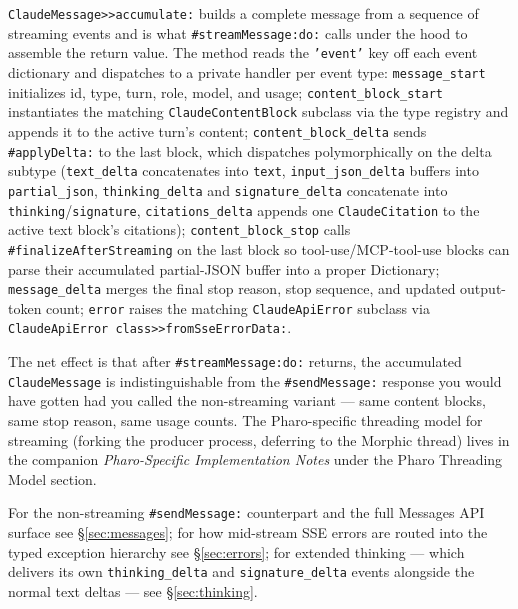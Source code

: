 \documentclass[a4paper,10pt,fleqn]{article}
\newcommand{\cls}[1]{\texttt{#1}}
\newcommand{\sel}[1]{\texttt{\##1}}
\begin{document}
\cls{ClaudeMessage>>accumulate:} builds a complete message
from a sequence of streaming events and is what
\sel{streamMessage:do:} calls under the hood to assemble the
return value.  The method reads the \texttt{'event'} key off
each event dictionary and dispatches to a private handler per
event type: \texttt{message\_start} initializes id, type, turn,
role, model, and usage; \texttt{content\_block\_start}
instantiates the matching \cls{ClaudeContentBlock} subclass
via the type registry and appends it to the active turn's
content; \texttt{content\_block\_delta} sends \sel{applyDelta:}
to the last block, which dispatches polymorphically on the
delta subtype (\texttt{text\_delta} concatenates into
\texttt{text}, \texttt{input\_json\_delta} buffers into
\texttt{partial\_json}, \texttt{thinking\_delta} and
\texttt{signature\_delta} concatenate into
\texttt{thinking}/\texttt{signature}, \texttt{citations\_delta}
appends one \cls{ClaudeCitation} to the active text block's
citations); \texttt{content\_block\_stop} calls
\sel{finalizeAfterStreaming} on the last block so
tool-use/MCP-tool-use blocks can parse their accumulated
partial-JSON buffer into a proper Dictionary;
\texttt{message\_delta} merges the final stop reason, stop
sequence, and updated output-token count; \texttt{error}
raises the matching \cls{ClaudeApiError} subclass via
\texttt{ClaudeApiError class>>fromSseErrorData:}.

The net effect is that after \sel{streamMessage:do:} returns,
the accumulated \cls{ClaudeMessage} is indistinguishable from
the \sel{sendMessage:} response you would have gotten had you
called the non-streaming variant --- same content blocks, same
stop reason, same usage counts.  The Pharo-specific threading
model for streaming (forking the producer process, deferring
to the Morphic thread) lives in the companion
\emph{Pharo-Specific Implementation Notes} under the Pharo
Threading Model section.

For the non-streaming \sel{sendMessage:} counterpart and the
full Messages API surface see \S\ref{sec:messages}; for how
mid-stream SSE errors are routed into the typed exception
hierarchy see \S\ref{sec:errors}; for extended thinking ---
which delivers its own \texttt{thinking\_delta} and
\texttt{signature\_delta} events alongside the normal text
deltas --- see \S\ref{sec:thinking}.

\medskip
{}
\end{document}
